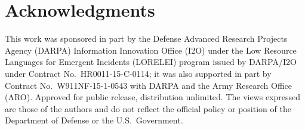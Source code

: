 \documentclass[11pt]{article}
\begin{document}
\section*{Acknowledgments}\begin{small}
This work was sponsored in part by the Defense Advanced Research Projects Agency (DARPA)
Information Innovation Office (I2O) under the Low Resource Languages for Emergent Incidents (LORELEI) program issued by DARPA/I2O under Contract No.~HR0011-15-C-0114;
it was also supported in part by Contract No.~W911NF-15-1-0543 with DARPA and the Army Research Office (ARO). Approved for public release, distribution unlimited. The views expressed are those of the authors and do not reflect the official policy or position of the Department of Defense or the U.S.~Government.

\end{small}




\appendix
\end{document}

